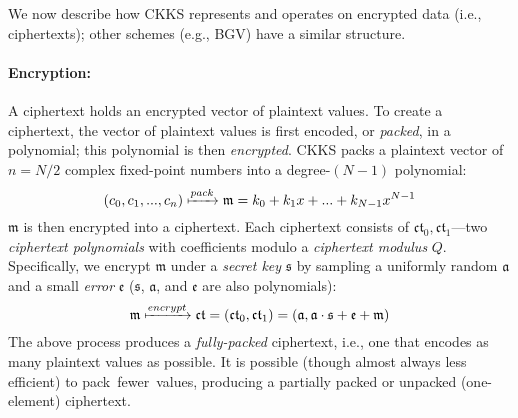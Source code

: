We now describe how CKKS represents and operates on encrypted data (i.e., ciphertexts);
other schemes (e.g., BGV) have a similar structure.

\paragraph{Encryption:} A ciphertext holds an encrypted vector of plaintext values.
To create a ciphertext, the vector of plaintext values is first encoded, or \emph{packed},
in a polynomial; this polynomial is then \emph{encrypted}.
CKKS packs a plaintext vector of $ n = N/2$ complex fixed-point numbers
into a degree-$(N-1)$ polynomial:
\begin{equation*}
    (c_0, c_1, ..., c_n) \xmapsto{pack} \mathfrak{m} = k_0 + k_1x + ... + k_{N-1}x^{N-1} %
\end{equation*}
$\mathfrak{m}$ is then encrypted into a ciphertext. Each ciphertext consists of
$\mathfrak{ct}_0, \mathfrak{ct}_1$---two \emph{ciphertext polynomials}
with coefficients modulo a \emph{ciphertext modulus} $Q$.
Specifically, we encrypt $\mathfrak{m}$
under a \emph{secret key} $\mathfrak{s}$
by sampling a uniformly random $\mathfrak{a}$
and a small \emph{error} $\mathfrak{e}$ ($\mathfrak{s}$, $\mathfrak{a}$, and $\mathfrak{e}$ are also polynomials):
\begin{equation*}
    \mathfrak{m} \xmapsto{encrypt} \mathfrak{ct} = (\mathfrak{ct}_0, \mathfrak{ct}_1) = (\mathfrak{a}, \mathfrak{a}\cdot\mathfrak{s}+\mathfrak{e}+\mathfrak{m})
\end{equation*}
The above process produces a \emph{fully-packed} ciphertext, i.e., one
that encodes as many plaintext values as possible. It is possible
(though almost always less efficient) to pack~fewer~values,
producing a partially packed or unpacked (one-element) ciphertext.

